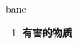 
\begin{frame}
{\huge bane}
\begin{center}
\begin{enumerate}\Large
  \item \textbf{有害的物质}
\end{enumerate}
\end{center}
\end{frame}
